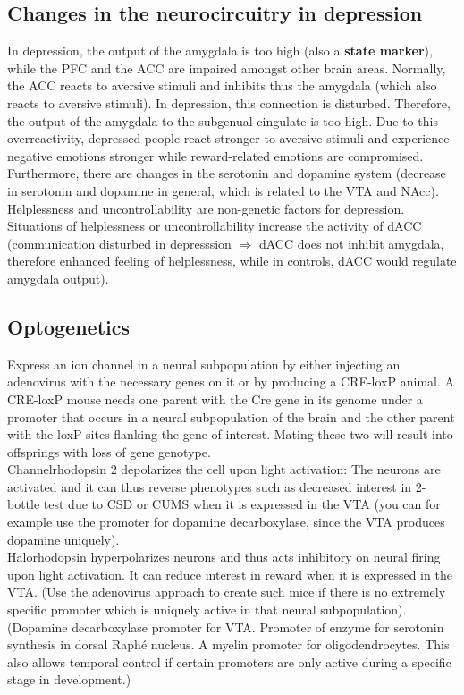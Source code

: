 \documentclass[twosided, a4paper, pt11]{article}
\begin{document}
	\subsection{Changes in the neurocircuitry in depression}
	In depression, the output of the amygdala is too high (also a \textbf{state marker}), while the PFC and the ACC are impaired amongst other brain areas. Normally, the ACC reacts to aversive stimuli and inhibits thus the amygdala (which also reacts to aversive stimuli). In depression, this connection is disturbed. Therefore, the output of the amygdala to the subgenual cingulate is too high. Due to this overreactivity, depressed people react stronger to aversive stimuli and experience negative emotions stronger while reward-related emotions are compromised. Furthermore, there are changes in the serotonin and dopamine system (decrease in serotonin and dopamine in general, which is related to the VTA and NAcc).\\
	Helplessness and uncontrollability are non-genetic factors for depression. Situations of helplessness or uncontrollability increase the activity of dACC (communication disturbed in depresssion $\Rightarrow$ dACC does not inhibit amygdala, therefore enhanced feeling of helplessness, while in controls, dACC would regulate amygdala output).
	
	\subsection{Optogenetics}
	Express an ion channel in a neural subpopulation by either injecting an adenovirus with the necessary genes on it or by producing a CRE-loxP animal. A CRE-loxP mouse needs one parent with the Cre gene in its genome under a promoter that occurs in a neural subpopulation of the brain and the other parent with the loxP sites flanking the gene of interest. Mating these two will result into offsprings with loss of gene genotype.\\
	Channelrhodopsin 2 depolarizes the cell upon light activation: The neurons are activated and it can thus reverse phenotypes such as decreased interest in 2-bottle test due to CSD or CUMS when it is expressed in the VTA (you can for example use the promoter for dopamine decarboxylase, since the VTA produces dopamine uniquely).\\
	Halorhodopsin hyperpolarizes neurons and thus acts inhibitory on neural firing upon light activation. It can reduce interest in reward when it is expressed in the VTA. (Use the adenovirus approach to create such mice if there is no extremely specific promoter which is uniquely active in that neural subpopulation).\\
	(Dopamine decarboxylase promoter for VTA. Promoter of enzyme for serotonin synthesis in dorsal Raph\'e nucleus. A myelin promoter for oligodendrocytes. This also allows temporal control if certain promoters are only active during a specific stage in development.)
	
\end{document}
